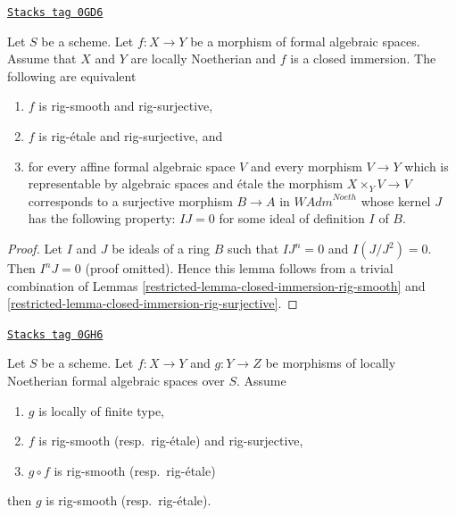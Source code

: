 \begin{lemma}
\label{restricted-lemma-closed-immersion-rig-smooth-rig-surjective}
\href{https://stacks.math.columbia.edu/tag/0GD6}{\texttt{Stacks tag 0GD6}}

Let $S$ be a scheme. Let $f : X \to Y$ be a morphism of formal algebraic
spaces. Assume that $X$ and $Y$ are locally Noetherian and $f$ is a
closed immersion. The following are equivalent
\begin{enumerate}
\item $f$ is rig-smooth and rig-surjective,
\item $f$ is rig-\'etale and rig-surjective, and
\item for every affine formal algebraic space $V$ and every morphism
$V \to Y$ which is representable by algebraic spaces and \'etale
the morphism $X \times_Y V \to V$ corresponds to a surjective morphism
$B \to A$ in $\textit{WAdm}^{Noeth}$ whose kernel $J$ has the following
property: $IJ = 0$ for some ideal of definition $I$ of $B$.
\end{enumerate}
\end{lemma}

\begin{proof}

Let $I$ and $J$ be ideals of a ring $B$ such that $IJ^n = 0$ and
$I(J/J^2) = 0$. Then $I^nJ = 0$ (proof omitted).
Hence this lemma follows from a trivial combination of
Lemmas \ref{restricted-lemma-closed-immersion-rig-smooth} and
\ref{restricted-lemma-closed-immersion-rig-surjective}.
\end{proof}

\begin{lemma}
\label{restricted-lemma-rig-etale-descent}
\href{https://stacks.math.columbia.edu/tag/0GH6}{\texttt{Stacks tag 0GH6}}

Let $S$ be a scheme. Let $f : X \to Y$ and $g : Y \to Z$
be morphisms of locally Noetherian formal algebraic spaces over $S$.
Assume
\begin{enumerate}
\item $g$ is locally of finite type,
\item $f$ is rig-smooth (resp.\ rig-\'etale) and rig-surjective,
\item $g \circ f$ is rig-smooth (resp.\ rig-\'etale)
\end{enumerate}
then $g$ is rig-smooth (resp.\ rig-\'etale).
\end{lemma}

